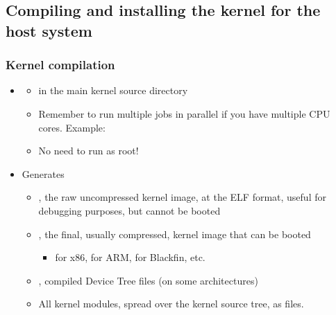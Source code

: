 \subsection[Installation on the host]{Compiling and installing the
  kernel for the host system}

\begin{frame}
  \frametitle{Kernel compilation}
  \begin{itemize}
  \item {}
    \begin{itemize}
    \item in the main kernel source directory
    \item Remember to run multiple jobs in parallel
          if you have multiple CPU cores. Example: 
    \item No need to run as root!
    \end{itemize}
  \item Generates
    \begin{itemize}
    \item {}, the raw uncompressed kernel image, at the
      ELF format, useful for debugging purposes, but cannot be booted
    \item {}, the final, usually
      compressed, kernel image that can be booted
      \begin{itemize}
      \item {} for x86,  for ARM,
         for Blackfin, etc.
      \end{itemize}
    \item {}, compiled Device Tree
      files (on some architectures)
    \item All kernel modules, spread over the kernel source tree, as
       files.
    \end{itemize}
  \end{itemize}
\end{frame}

